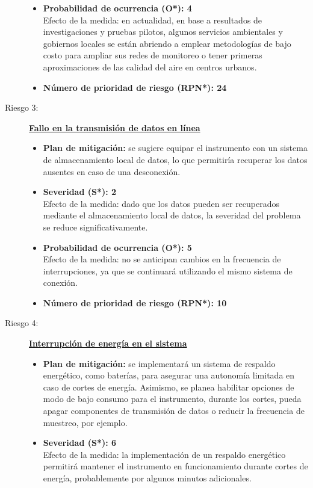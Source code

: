 \begin{description}
\begin{itemize}
			\item \textbf{Probabilidad de ocurrencia (O*): 4} \\
			Efecto de la medida: en actualidad, en base a resultados de investigaciones y pruebas pilotos, algunos servicios ambientales y gobiernos locales se están abriendo a emplear metodologías de bajo costo para ampliar sus redes de monitoreo o tener primeras aproximaciones de las calidad del aire en centros urbanos.
			\item \textbf{Número de prioridad de riesgo (RPN*): 24} 
			\end{itemize}	
			
		\item[Riesgo 3:] \textbf{\underline{Fallo en la transmisión de datos en línea}}
	\begin{itemize}
			\item \textbf{Plan de mitigación:} se sugiere equipar el instrumento con un sistema de almacenamiento local de datos, lo que permitiría recuperar los datos ausentes en caso de una desconexión.
			
			\item \textbf{Severidad (S*): 2} \\
			Efecto de la medida: dado que los datos pueden ser recuperados mediante el almacenamiento local de datos, la severidad del problema se reduce significativamente.
			
			\item \textbf{Probabilidad de ocurrencia (O*): 5} \\
			Efecto de la medida: no se anticipan cambios en la frecuencia de interrupciones, ya que se continuará utilizando el mismo sistema de conexión.
			
			\item \textbf{Número de prioridad de riesgo (RPN*): 10}
	\end{itemize}

			\item[Riesgo 4:] \textbf{\underline{Interrupción de energía en el sistema}}
	\begin{itemize}
			\item \textbf{Plan de mitigación:} se implementará un sistema de respaldo energético, como baterías, para asegurar una autonomía limitada en caso de cortes de energía. Asimismo, se planea habilitar opciones de modo de bajo consumo para el instrumento, durante los cortes, pueda apagar componentes de transmisión de datos o reducir la frecuencia de muestreo, por ejemplo.
			
			\item \textbf{Severidad (S*): 6} \\
			Efecto de la medida: la implementación de un respaldo energético permitirá mantener el instrumento en funcionamiento durante cortes de energía, probablemente por algunos minutos adicionales.
			

\end{itemize}
\end{description}
